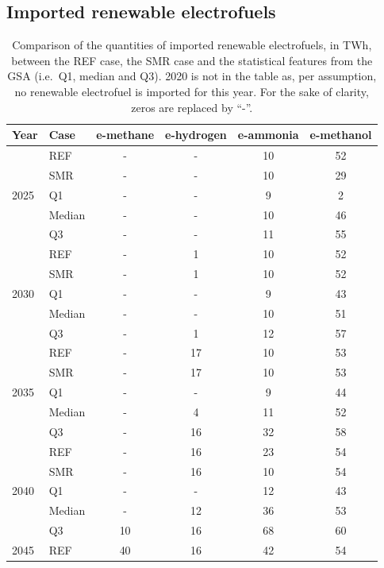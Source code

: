 \documentclass[11pt,twoside,a4paper,english]{article}
\def\ie{i.e.\ }
\begin{document}
\begin{appendices}
\subsection{Imported renewable electrofuels}
\label{app:UQ_electrofuels}
\begin{table}[htbp]
\caption{Comparison of the quantities of imported renewable electrofuels, in TWh, between the REF case, the SMR case and the statistical features from the \gls{GSA} (\ie Q1, median and Q3). 2020 is not in the table as, per assumption, no renewable electrofuel is imported for this year. For the sake of clarity, zeros are replaced by ``-''.}
\label{tab:uq_ref_smr_med}
\begin{minipage}{\linewidth}
\centering
\begin{tabular}{l l | c c c c}
\toprule
\textbf{Year} & \textbf{Case} & \textbf{e-methane} & \textbf{e-hydrogen} & \textbf{e-ammonia} & \textbf{e-methanol}\\	
\toprule							
\multirow{5}{*}{2025}
 & REF & - & - & 10 & 52\\
 & SMR & - & -  & 10 & 29\\
 \cmidrule{2 - 6}
 & Q1 & - & - & 9 & 2\\
 & Median & - & - & 10 & 46\\
 & Q3 & - & - & 11 & 55\\
\toprule
\multirow{5}{*}{2030}
 & REF & - & 1 & 10 & 52\\
 & SMR & - & 1 & 10 & 52\\
 \cmidrule{2 - 6}
 & Q1 & - & - & 9 & 43\\
 & Median & - & - & 10 & 51\\
 & Q3 & - & 1 & 12 & 57\\
\toprule
\multirow{5}{*}{2035}
 & REF & - & 17 & 10 & 53\\
 & SMR & - & 17 & 10 & 53\\
 \cmidrule{2 - 6}
 & Q1 & - & - & 9 & 44\\
 & Median & - & 4 & 11 & 52\\
 & Q3 & - & 16 & 32 & 58\\
\toprule
\multirow{5}{*}{2040}
 & REF & - & 16 & 23 & 54\\
 & SMR & - & 16 & 10 & 54\\
 \cmidrule{2 - 6}
 & Q1 & - & - & 12 & 43\\
 & Median & - & 12 & 36 & 53\\
 & Q3 & 10 & 16 & 68 & 60\\
\toprule
\multirow{5}{*}{2045}
 & REF & 40 & 16 & 42 & 54\\

\end{tabular}
\end{minipage}
\end{table}
\end{appendices}
\end{document}

